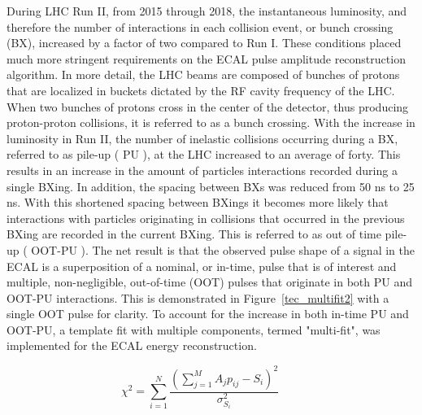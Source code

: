 During LHC Run II, from 2015 through 2018, the instantaneous luminosity, and therefore the number of interactions in each collision event, or bunch crossing (BX), increased by a factor of two compared to Run I. These conditions placed much more stringent requirements on the ECAL pulse amplitude reconstruction algorithm. In more detail, the LHC beams are composed of bunches of protons that are localized in buckets dictated by the RF cavity frequency of the LHC. When two bunches of protons cross in the center of the detector, thus producing proton-proton collisions, it is referred to as a bunch crossing. With the increase in luminosity in Run II, the number of inelastic collisions occurring during a BX, referred to as pile-up ( PU ), at the LHC increased to an average of forty. This results in an increase in the amount of particles interactions recorded during a single BXing.  In addition, the spacing between BXs was reduced from 50 ns to 25 ns. With this shortened spacing between BXings it becomes more likely that interactions with particles originating in collisions that occurred in the previous BXing are recorded in the current BXing. This is referred to as out of time pile-up ( OOT-PU ). The net result is that the observed pulse shape of a signal in the ECAL is a superposition of a nominal, or in-time, pulse that is of interest and multiple, non-negligible, out-of-time (OOT) pulses that originate in both PU and OOT-PU interactions. This is demonstrated in Figure~\ref{tec_multifit2} with a single OOT pulse for clarity. To account for the increase in both in-time PU and OOT-PU, a template fit with multiple components, termed "multi-fit", was implemented for the ECAL energy reconstruction. 

\begin{equation}\label{en-mf}
    \chi^{2} = \sum^{N}_{i=1} \frac{(\sum^{M}_{j=1} A_{j}p_{ij} - S_{i} )^{2}}{\sigma^{2}_{S_{i}}}\qquad
\end{equation}


